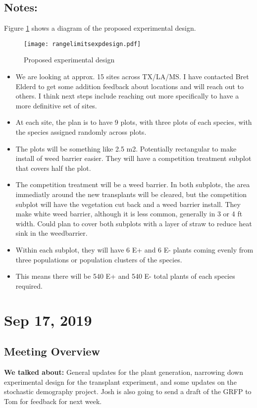\documentclass{article}
\begin{document}
 \subsection*{Notes:}
 Figure \ref{fig:rangelimitsexpdesign} shows a diagram of the proposed experimental design.
 \begin{figure}[h!]
 \texttt{[image: rangelimitsexpdesign.pdf]}
 \caption{Proposed experimental design}
 \label{fig:rangelimitsexpdesign}
 \end{figure}
 \begin{itemize}
 \item{We are looking at approx. 15 sites across TX/LA/MS. I have contacted Bret Elderd to get some addition feedback about locations and will reach out to others. I think next steps include reaching out more specifically to have a more definitive set of sites.}
 \item{At each site, the plan is to have 9 plots, with three plots of each species, with the species assigned randomly across plots.}
 \item{The plots will be something like 2.5 m2. Potentially rectangular to make install of weed barrier easier. They will have a competition treatment subplot that covers half the plot.}
 \item{The competition treatment will be a weed barrier. In both subplots, the area immediatly around the new transplants will be cleared, but the competition subplot will have the vegetation cut back and a weed barrier install. They make white weed barrier, although it is less common, generally in 3 or 4 ft width. Could plan to cover both subplots with a layer of straw to reduce heat sink in the weedbarrier.}
 \item{Within each subplot, they will have 6 E+ and 6 E- plants coming evenly from three populations or population clusters of the species.}
 \item{This means there will be 540 E+ and 540 E- total plants of each species required.}
 \end{itemize}
 
 
 \section*{Sep 17, 2019}
 \subsection*{Meeting Overview}
 \textbf{We talked about:}
 General updates for the plant generation, narrowing down experimental design for the transplant experiment, and some updates on the stochastic demography project. Josh is also going to send a draft of the GRFP to Tom for feedback for next week. 
 
\end{document}
